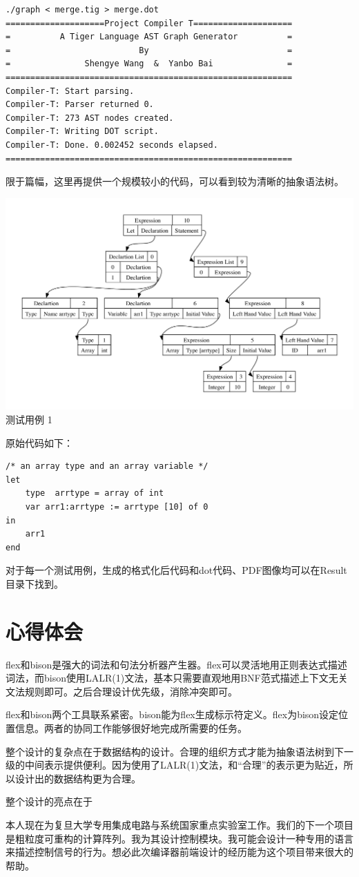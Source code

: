 \begin{verbatim}
./graph < merge.tig > merge.dot
====================Project Compiler T====================
=          A Tiger Language AST Graph Generator          =
=                          By                            =
=               Shengye Wang  &  Yanbo Bai               =
==========================================================
Compiler-T: Start parsing.
Compiler-T: Parser returned 0.
Compiler-T: 273 AST nodes created.
Compiler-T: Writing DOT script.
Compiler-T: Done. 0.002452 seconds elapsed.
==========================================================
\end{verbatim}

限于篇幅，这里再提供一个规模较小的代码，可以看到较为清晰的抽象语法树。

\begin{center}
\includegraphics[width=\columnwidth]{small}  \\
测试用例 1
\end{center}

原始代码如下：

\begin{verbatim}
/* an array type and an array variable */
let
	type  arrtype = array of int
	var arr1:arrtype := arrtype [10] of 0
in
	arr1
end
\end{verbatim}

对于每一个测试用例，生成的格式化后代码和dot代码、PDF图像均可以在Result目录下找到。

\section{心得体会}

flex和bison是强大的词法和句法分析器产生器。flex可以灵活地用正则表达式描述词法，而bison使用LALR(1)文法，基本只需要直观地用BNF范式描述上下文无关文法规则即可。之后合理设计优先级，消除冲突即可。

flex和bison两个工具联系紧密。bison能为flex生成标示符定义。flex为bison设定位置信息。两者的协同工作能够很好地完成所需要的任务。

整个设计的复杂点在于数据结构的设计。合理的组织方式才能为抽象语法树到下一级的中间表示提供便利。因为使用了LALR(1)文法，和“合理”的表示更为贴近，所以设计出的数据结构更为合理。

整个设计的亮点在于

本人现在为复旦大学专用集成电路与系统国家重点实验室工作。我们的下一个项目是粗粒度可重构的计算阵列。我为其设计控制模块。我可能会设计一种专用的语言来描述控制信号的行为。想必此次编译器前端设计的经历能为这个项目带来很大的帮助。



